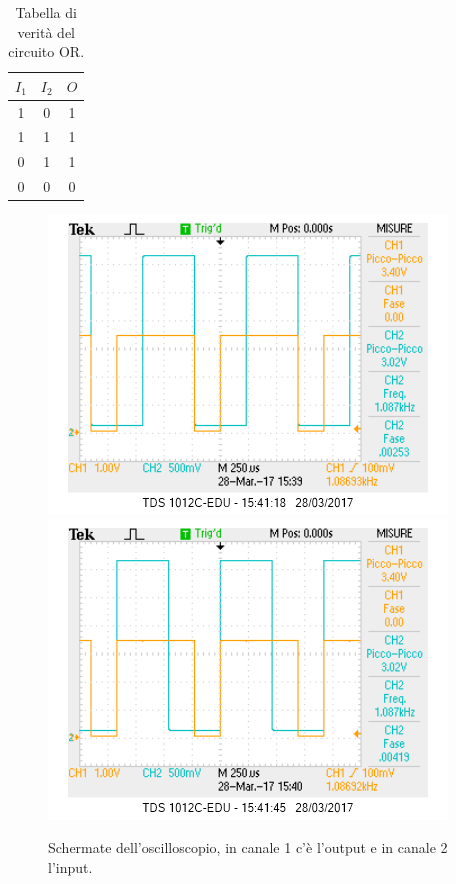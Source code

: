 \documentclass[10pt,a4paper]{article}
\begin{document}
\begin{table}[!htb]
\begin{tabular}{|c|c|c|}
\hline 
$I_1$ & $I_2$ & $O$ \\
\hline
 1 &  0 & 1\\ 

 1 &  1 & 1\\ 
 
 0 &  1 & 1\\ 
 
 0 &  0 & 0\\ 
\hline 
\end{tabular} 
\caption{Tabella di verità del circuito OR.\label{tab:OR}}
\end{table}

\begin{figure}[!htb]
  \centering
  \includegraphics[scale=0.75]{or1.png}\includegraphics[scale=0.75]{or2.png}
\caption{Schermate dell'oscilloscopio, in canale 1 c'è l'output e in canale 2 l'input.\label{osc:OR}}
\end{figure}
\end{document}
